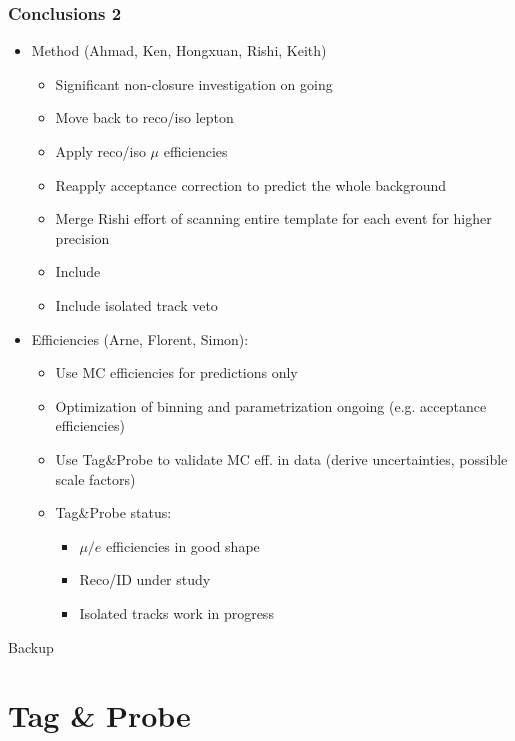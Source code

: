 \documentclass{beamer}
\begin{document}
\begin{frame}
 \frametitle{Conclusions 2}
 \begin{itemize}
  \item \hadtau Method (Ahmad, Ken, Hongxuan, Rishi, Keith)
  \begin{itemize}
   \item Significant non-closure investigation on going
   \item Move back to reco/iso lepton
   \item Apply reco/iso $\mu$ efficiencies
   \item Reapply acceptance correction to predict the whole \hadtau background
   \item Merge Rishi effort of scanning entire template for each event for higher precision
   \item Include \wpj
   \item Include isolated track veto
  \end{itemize}
  \item Efficiencies (Arne, Florent, Simon):
  \begin{itemize}
   \item Use MC efficiencies for predictions only
   \item Optimization of binning and parametrization ongoing (e.g. acceptance efficiencies)
   \item Use Tag\&Probe to validate MC eff. in data (derive uncertainties, possible scale factors)
   \item Tag\&Probe status:
   \begin{itemize}
    \item $\mu/e$ efficiencies in good shape
    \item Reco/ID under study
    \item Isolated tracks work in progress
   \end{itemize}

  \end{itemize}


 \end{itemize}

\end{frame}




\begin{frame}
 \begin{block}{}
 \centering
 \Large Backup
 \end{block}
\end{frame}

\section{Tag \& Probe}
\end{document}

